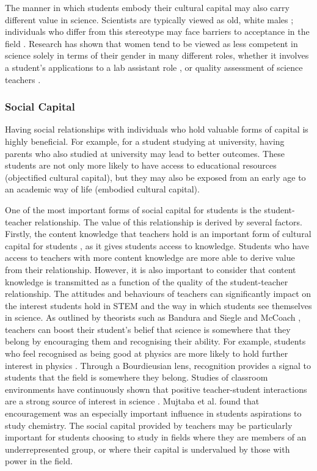 \documentclass[smallextended]{svjour3}       %
\begin{document}
The manner in which students embody their cultural capital may also carry different value in science. Scientists are typically viewed as old, white males \cite{Nosek_2009,Barthelemy_2016}; individuals who differ from this stereotype may face barriers to acceptance in the field \cite{ong2005body}. Research has shown that women tend to be viewed as less competent in science solely in terms of their gender in many different roles, whether it involves a student's applications to a lab assistant role \cite{Moss_2012}, or quality assessment of science teachers \cite{Potvin_2016}. 

\subsubsection*{Social Capital}
Having social relationships with individuals who hold valuable forms of capital is highly beneficial. For example, for a student studying at university, having parents who also studied at university may lead to better outcomes. These students are not only more likely to have access to educational resources (objectified cultural capital), but they may also be exposed from an early age to an academic way of life (embodied cultural capital).

One of the most important forms of social capital for students is the student-teacher relationship. The value of this relationship is derived by several factors. Firstly, the content knowledge that teachers hold is an important form of cultural capital for students \cite{goldhaber2000does,wayne2003teacher,keller2017impact}, as it gives students access to knowledge. Students who have access to teachers with more content knowledge are more able to derive value from their relationship. However, it is also important to consider that content knowledge is transmitted as a function of the quality of the student-teacher relationship. The attitudes and behaviours of teachers can significantly impact on the interest students hold in STEM \cite{keller2017impact} and the way in which students see themselves in science. As outlined by theorists such as Bandura \citeyear{bandura1986explanatory} and Siegle and McCoach \citeyear{siegle2007increasing}, teachers can boost their student's belief that science is somewhere that they belong by encouraging them and recognising their ability. For example, students who feel recognised as being good at physics are more likely to hold further interest in physics \cite{Hazari2017}. Through a Bourdieusian lens, recognition provides a signal to students that the field is somewhere they belong. Studies of classroom environments have continuously shown that positive teacher-student interactions are a strong source of interest in science \cite{osborne2003attitudes,keller2017impact}. Mujtaba et al. \citeyear{mujtaba2018students} found that encouragement was an especially important influence in students aspirations to study chemistry. The social capital provided by teachers may be particularly important for students choosing to study in fields where they are members of an underrepresented group, or where their capital is undervalued by those with power in the field.
\end{document}
